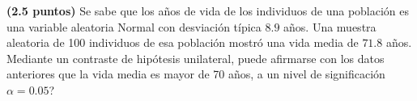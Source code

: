 
\textbf{(2.5 puntos)} Se sabe que los años de vida de los individuos de una población es una variable aleatoria Normal con desviación típica $8.9$ años. Una muestra aleatoria de 100 individuos de esa población mostró una vida media de $71.8$ años. Mediante un contraste de hipótesis unilateral, \textquestiondown{}puede afirmarse con los datos anteriores que la vida media es mayor de 70 años, a un nivel de significación $\alpha=0.05$?
